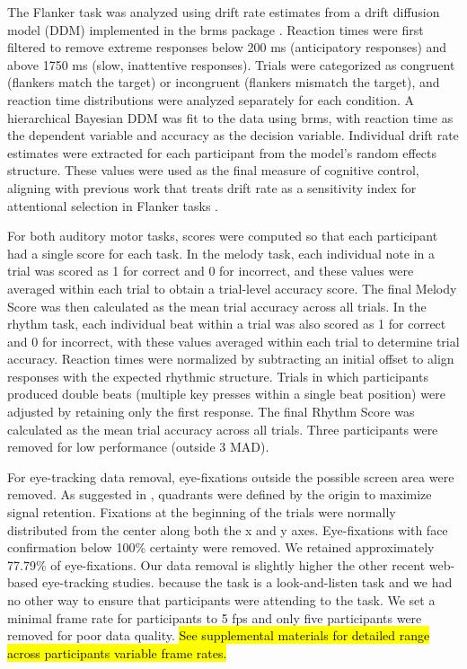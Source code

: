 The Flanker task was analyzed using drift rate estimates from a drift diffusion model (DDM) implemented in the brms package \parencite{burkner2017brms}. Reaction times were first filtered to remove extreme responses below 200 ms (anticipatory responses) and above 1750 ms (slow, inattentive responses). Trials were categorized as congruent (flankers match the target) or incongruent (flankers mismatch the target), and reaction time distributions were analyzed separately for each condition. A hierarchical Bayesian DDM was fit to the data using brms, with reaction time as the dependent variable and accuracy as the decision variable. Individual drift rate estimates were extracted for each participant from the model’s random effects structure. These values were used as the final measure of cognitive control, aligning with previous work that treats drift rate as a sensitivity index for attentional selection in Flanker tasks \parencite{poole2024putting}. 

For both auditory motor tasks, scores were computed so that each participant had a single score for each task. In the melody task, each individual note in a trial was scored as 1 for correct and 0 for incorrect, and these values were averaged within each trial to obtain a trial-level accuracy score. The final Melody Score was then calculated as the mean trial accuracy across all trials.  In the rhythm task, each individual beat within a trial was also scored as 1 for correct and 0 for incorrect, with these values averaged within each trial to determine trial accuracy. Reaction times were normalized by subtracting an initial offset to align responses with the expected rhythmic structure. Trials in which participants produced double beats (multiple key presses within a single beat position) were adjusted by retaining only the first response. The final Rhythm Score was calculated as the mean trial accuracy across all trials. Three participants were removed for low performance (outside 3 MAD).

For eye-tracking data removal, eye-fixations outside the possible screen area were removed. As suggested in \textcite{AOW}, quadrants were defined by the origin to maximize signal retention. Fixations at the beginning of the trials were normally distributed from the center along both the x and y axes. Eye-fixations with face confirmation below 100\% certainty were removed. We retained approximately 77.79\% of eye-fixations. Our data removal is slightly higher the other recent web-based eye-tracking studies. because the task is a look-and-listen task and we had no other way to ensure that participants were attending to the task. We set a minimal frame rate for participants to 5 fps \parencite{Vos_2022} and only five participants were removed for poor data quality. \hl{See supplemental materials for detailed range across participants variable frame rates.}

